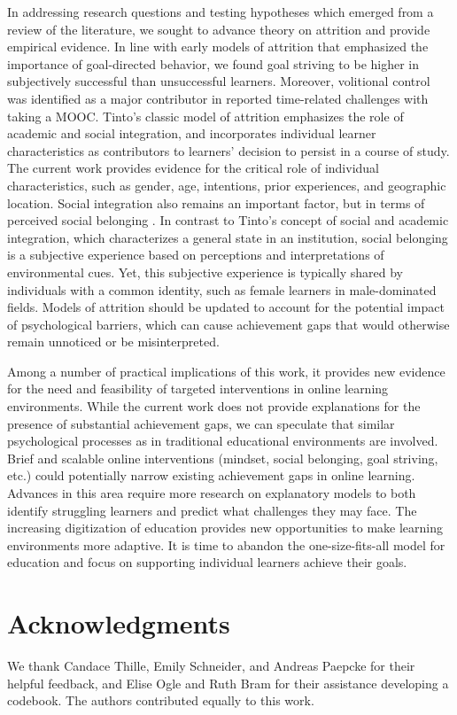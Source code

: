 \documentclass{sigchi}\usepackage[]{graphicx}\usepackage[]{color}
\begin{document}
In addressing research questions and testing hypotheses which emerged from a review of the literature, we sought to advance theory on attrition and provide empirical evidence. In line with early models of attrition that emphasized the importance of goal-directed behavior, we found goal striving to be higher in subjectively successful than unsuccessful learners. Moreover, volitional control was identified as a major contributor in reported time-related challenges with taking a MOOC. Tinto's \cite{tinto1975dropout} classic model of attrition emphasizes the role of academic and social integration, and incorporates individual learner characteristics as contributors to learners' decision to persist in a course of study. The current work provides evidence for the critical role of individual characteristics, such as gender, age, intentions, prior experiences, and geographic location. Social integration also remains an important factor, but in terms of perceived social belonging \cite{walton2007question}. In contrast to Tinto's concept of social and academic integration, which characterizes a general state in an institution, social belonging is a subjective experience based on perceptions and interpretations of environmental cues. Yet, this subjective experience is typically shared by individuals with a common identity, such as female learners in male-dominated fields. Models of attrition should be updated to account for the potential impact of psychological barriers, which can cause achievement gaps that would otherwise remain unnoticed or be misinterpreted. 

Among a number of practical implications of this work, it provides new evidence for the need and feasibility of targeted interventions in online learning environments. While the current work does not provide explanations for the presence of substantial achievement gaps, we can speculate that similar psychological processes as in traditional educational environments are involved. Brief and scalable online interventions (mindset, social belonging, goal striving, etc.) could potentially narrow existing achievement gaps in online learning. Advances in this area require more research on explanatory models to both identify struggling learners and predict what challenges they may face. The increasing digitization of education provides new opportunities to make learning environments more adaptive. It is time to abandon the one-size-fits-all model for education and focus on supporting individual learners achieve their goals.


\section{Acknowledgments}
We thank Candace Thille, Emily Schneider, and Andreas Paepcke for their helpful feedback, and Elise Ogle and Ruth Bram for their assistance developing a codebook. The authors contributed equally to this work.

\balance



\end{document}
